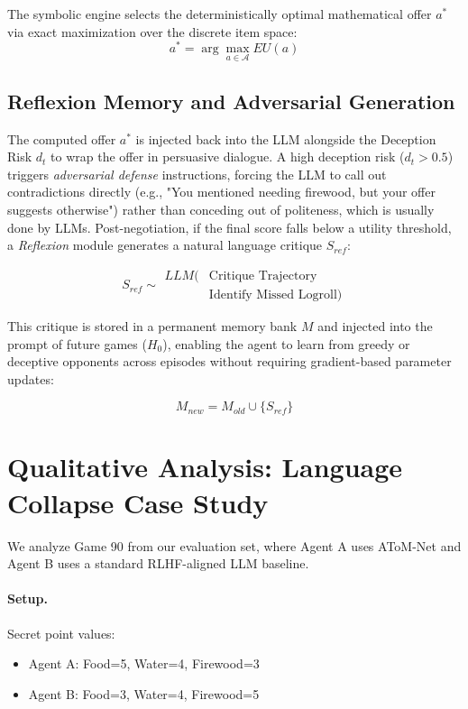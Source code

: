 \documentclass[11pt]{article}
\begin{document}
The symbolic engine selects the deterministically optimal mathematical offer $a^*$ via exact maximization over the discrete item space:
\begin{equation}
a^* = \arg \max_{a \in \mathcal{A}} EU(a)
\end{equation}

\subsection{Reflexion Memory and Adversarial Generation}

The computed offer $a^*$ is injected back into the LLM alongside the Deception Risk $d_t$ to wrap the offer in persuasive dialogue. A high deception risk ($d_t > 0.5$) triggers \textit{adversarial defense} instructions, forcing the LLM to call out contradictions directly (e.g., "You mentioned needing firewood, but your offer suggests otherwise") rather than conceding out of politeness, which is usually done by LLMs. Post-negotiation, if the final score falls below a utility threshold, a \textit{Reflexion} module generates a natural language critique $S_{ref}$:

\begin{equation}
S_{ref} \sim 
\begin{aligned}
LLM(&\text{Critique Trajectory} \\
    &\text{Identify Missed Logroll})
\end{aligned}
\end{equation}

This critique is stored in a permanent memory bank $M$ and injected into the prompt of future games ($H_0$), enabling the agent to learn from greedy or deceptive opponents across episodes without requiring gradient-based parameter updates:

\begin{equation}
M_{new} = M_{old} \cup \{S_{ref}\}
\end{equation}

\section{Qualitative Analysis: Language Collapse Case Study}

We analyze Game 90 from our evaluation set, where Agent A uses AToM-Net and Agent B uses a standard RLHF-aligned LLM baseline.

\paragraph{Setup.}
Secret point values:
\begin{itemize}
\item Agent A: Food=5, Water=4, Firewood=3
\item Agent B: Food=3, Water=4, Firewood=5
\end{itemize}
\end{document}
